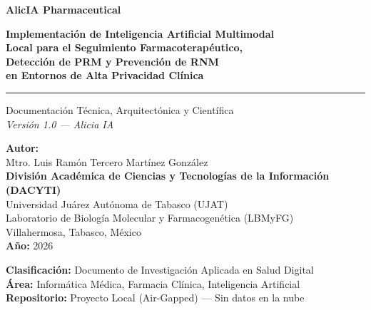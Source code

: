 \documentclass[12pt,a4paper]{article}
\begin{document}
\begin{titlepage}
  \centering
  \vspace*{1cm}


  \vspace{1.5cm}

  {\huge\bfseries\color{primary}
    AlicIA Pharmaceutical\\[0.4cm]
  }

  {\Large\bfseries
    Implementación de Inteligencia Artificial Multimodal\\
    Local para el Seguimiento Farmacoterapéutico,\\
    Detección de PRM y Prevención de RNM\\
    en Entornos de Alta Privacidad Clínica
  }

  \vspace{1cm}
  \rule{\linewidth}{1.5pt}
  \vspace{0.5cm}

  {\large
    Documentación Técnica, Arquitectónica y Científica\\[0.2cm]
    \textit{Versión 1.0 --- Alicia IA}
  }

  \vspace{1cm}

  {\Large\bfseries Autor:}\\
  {\Large Mtro. Luis Ramón Tercero Martínez González} \\[1cm]

  {\normalsize
    \textbf{División Académica de Ciencias y Tecnologías de la Información (DACYTI)}\\
    Universidad Juárez Autónoma de Tabasco (UJAT)\\
    Laboratorio de Biolog\'ia Molecular y Farmacogen\'etica (LBMyFG)\\[0.3cm]
    Villahermosa, Tabasco, México\\[0.3cm]
    \textbf{Año:} 2026
  }

  \vfill

  \begin{tcolorbox}[colback=primary!10, colframe=primary, width=0.85\textwidth]
    \centering\small
    \textbf{Clasificación:} Documento de Investigación Aplicada en Salud Digital\\
    \textbf{Área:} Informática Médica, Farmacia Clínica, Inteligencia Artificial\\
    \textbf{Repositorio:} Proyecto Local (Air-Gapped) --- Sin datos en la nube
  \end{tcolorbox}
\end{titlepage}
\end{document}
